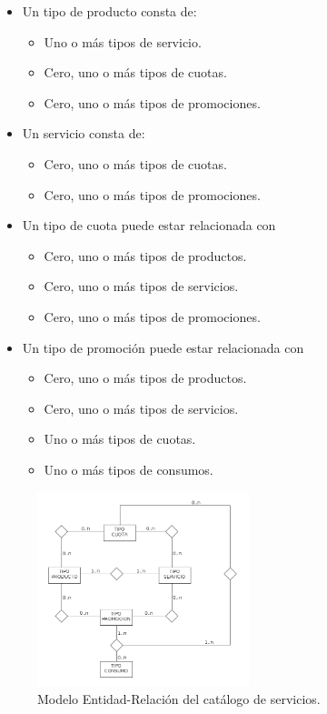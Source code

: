 \begin{itemize}
\item Un tipo de producto consta de:
	\begin{itemize}
		\item Uno o más tipos de servicio.
		\item Cero, uno o más tipos de cuotas.
		\item Cero, uno o más tipos de promociones.
	\end{itemize}
\item Un servicio consta de:
	\begin{itemize}
		\item Cero, uno o más tipos de cuotas.
		\item Cero, uno o más tipos de promociones.
	\end{itemize}
		\item Un tipo de cuota puede estar relacionada con 
	\begin{itemize}
		\item Cero, uno o más tipos de productos.
		\item Cero, uno o más tipos de servicios.
		\item Cero, uno o más tipos de promociones.
	\end{itemize}
\item Un tipo de promoción puede estar relacionada con 
	\begin{itemize}
		\item Cero, uno o más tipos de productos.
		\item Cero, uno o más tipos de servicios.
		\item Uno o más tipos de cuotas.
		\item Uno o más tipos de consumos.
	\end{itemize}
\end{itemize}


\begin{figure}
  \centering
  \includegraphics[width=0.55\textwidth]{imaxes/catalogo.png}
  \caption{Modelo Entidad-Relación del catálogo de servicios.}
  \label{fig:catalogo-chap-analisis}
\end{figure}

